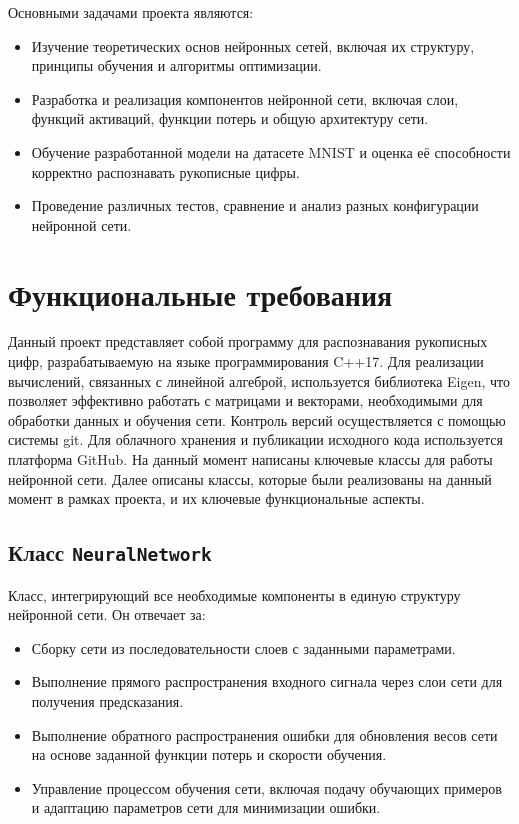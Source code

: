\documentclass{article}
\begin{document}
Основными задачами проекта являются:
\begin{itemize}
    \item Изучение теоретических основ нейронных сетей, включая их структуру, принципы обучения и алгоритмы оптимизации.
    \item Разработка и реализация компонентов нейронной сети, включая слои, функций активаций, функции потерь и общую архитектуру сети.
    \item Обучение разработанной модели на датасете MNIST и оценка её способности корректно распознавать рукописные цифры.
    \item Проведение различных тестов, сравнение и анализ разных конфигурации нейронной сети.
\end{itemize}

\section{Функциональные требования}
Данный проект представляет собой программу для распознавания рукописных цифр, разрабатываемую на языке программирования C++17. Для реализации вычислений, связанных с линейной алгеброй, используется библиотека Eigen, что позволяет эффективно работать с матрицами и векторами, необходимыми для обработки данных и обучения сети.
Контроль версий осуществляется с помощью системы git. Для облачного хранения и публикации исходного кода используется платформа GitHub. 
На данный момент написаны ключевые классы для работы нейронной сети. Далее описаны классы, которые были реализованы на данный момент в рамках проекта, и их ключевые функциональные аспекты.

\subsection{Класс \texttt{NeuralNetwork}}
Класс, интегрирующий все необходимые компоненты в единую структуру нейронной сети. Он отвечает за:
\begin{itemize}
    \item Сборку сети из последовательности слоев с заданными параметрами.
    \item Выполнение прямого распространения входного сигнала через слои сети для получения предсказания.
    \item Выполнение обратного распространения ошибки для обновления весов сети на основе заданной функции потерь и скорости обучения.
    \item Управление процессом обучения сети, включая подачу обучающих примеров и адаптацию параметров сети для минимизации ошибки.
\end{itemize}
\end{document}

